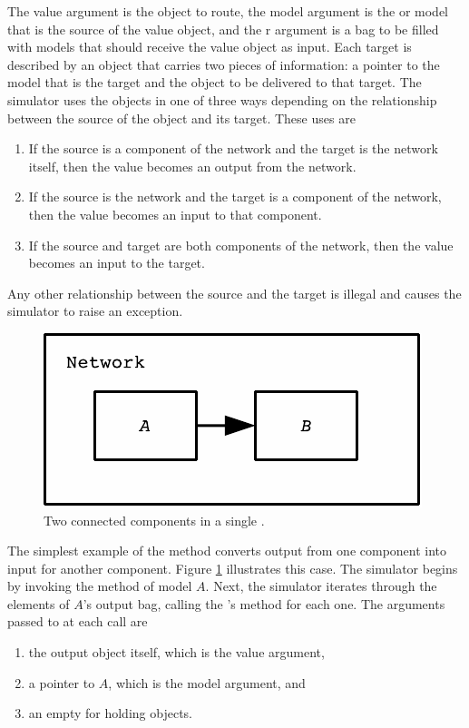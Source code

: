 The value argument is the object to route, the model argument is the  or  model that is the source of the value object, and the r argument is a bag to be filled with models that should receive the value object as input. Each target is described by an  object that carries two pieces of information: a pointer to the model that is the target and the object to be delivered to that target. The simulator uses the  objects in one of three ways depending on the relationship between the source of the object and its target. These uses are
\begin{enumerate}
\item If the source is a component of the network and the target is the network itself, then the value becomes an output from the network.
\item If the source is the network and the target is a component of the network, then the value becomes an input to that component.
\item If the source and target are both components of the network, then the value becomes an input to the target.
\end{enumerate}
Any other relationship between the source and the target is illegal and causes the simulator to raise an exception.

\begin{figure}[ht]
\centering
\includegraphics{network_models_figs/connected_atomic_models.pdf}
\caption{Two connected  components in a single .}
\label{fig:atomic_to_atomic_coupling}
\end{figure}
The simplest example of the  method converts output from one  component into input for another  component. Figure \ref{fig:atomic_to_atomic_coupling} illustrates this case. The simulator begins by invoking the  method of  model $A$. Next, the simulator iterates through the elements of $A$'s output bag, calling the 's  method for each one. The arguments passed to  at each call are
\begin{enumerate}
\item the output object itself, which is the value argument,
\item a pointer to $A$, which is the model argument, and
\item an empty  for holding  objects.
\end{enumerate}

